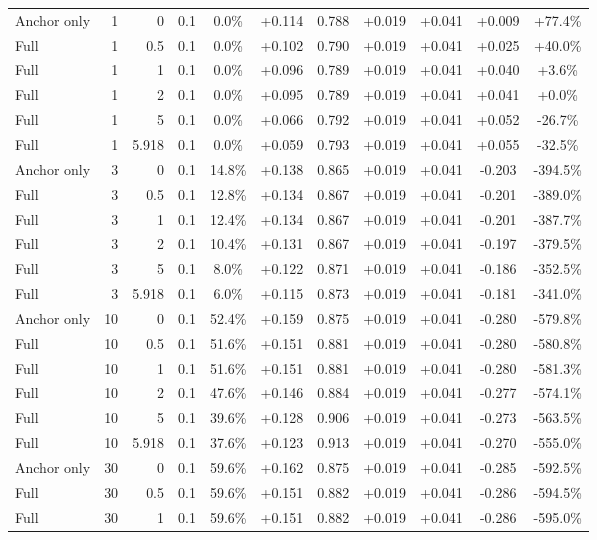 \begin{table}[htbp]
\begin{tabular}{lrrrccccccc}
Anchor only & 1 & 0 & 0.1 & 0.0\% & +0.114 & 0.788 & +0.019 & +0.041 & +0.009 & +77.4\% \\
Full & 1 & 0.5 & 0.1 & 0.0\% & +0.102 & 0.790 & +0.019 & +0.041 & +0.025 & +40.0\% \\
Full & 1 & 1 & 0.1 & 0.0\% & +0.096 & 0.789 & +0.019 & +0.041 & +0.040 & +3.6\% \\
Full & 1 & 2 & 0.1 & 0.0\% & +0.095 & 0.789 & +0.019 & +0.041 & +0.041 & +0.0\% \\
Full & 1 & 5 & 0.1 & 0.0\% & +0.066 & 0.792 & +0.019 & +0.041 & +0.052 & -26.7\% \\
Full & 1 & 5.918 & 0.1 & 0.0\% & +0.059 & 0.793 & +0.019 & +0.041 & +0.055 & -32.5\% \\
Anchor only & 3 & 0 & 0.1 & 14.8\% & +0.138 & 0.865 & +0.019 & +0.041 & -0.203 & -394.5\% \\
Full & 3 & 0.5 & 0.1 & 12.8\% & +0.134 & 0.867 & +0.019 & +0.041 & -0.201 & -389.0\% \\
Full & 3 & 1 & 0.1 & 12.4\% & +0.134 & 0.867 & +0.019 & +0.041 & -0.201 & -387.7\% \\
Full & 3 & 2 & 0.1 & 10.4\% & +0.131 & 0.867 & +0.019 & +0.041 & -0.197 & -379.5\% \\
Full & 3 & 5 & 0.1 & 8.0\% & +0.122 & 0.871 & +0.019 & +0.041 & -0.186 & -352.5\% \\
Full & 3 & 5.918 & 0.1 & 6.0\% & +0.115 & 0.873 & +0.019 & +0.041 & -0.181 & -341.0\% \\
Anchor only & 10 & 0 & 0.1 & 52.4\% & +0.159 & 0.875 & +0.019 & +0.041 & -0.280 & -579.8\% \\
Full & 10 & 0.5 & 0.1 & 51.6\% & +0.151 & 0.881 & +0.019 & +0.041 & -0.280 & -580.8\% \\
Full & 10 & 1 & 0.1 & 51.6\% & +0.151 & 0.881 & +0.019 & +0.041 & -0.280 & -581.3\% \\
Full & 10 & 2 & 0.1 & 47.6\% & +0.146 & 0.884 & +0.019 & +0.041 & -0.277 & -574.1\% \\
Full & 10 & 5 & 0.1 & 39.6\% & +0.128 & 0.906 & +0.019 & +0.041 & -0.273 & -563.5\% \\
Full & 10 & 5.918 & 0.1 & 37.6\% & +0.123 & 0.913 & +0.019 & +0.041 & -0.270 & -555.0\% \\
Anchor only & 30 & 0 & 0.1 & 59.6\% & +0.162 & 0.875 & +0.019 & +0.041 & -0.285 & -592.5\% \\
Full & 30 & 0.5 & 0.1 & 59.6\% & +0.151 & 0.882 & +0.019 & +0.041 & -0.286 & -594.5\% \\
Full & 30 & 1 & 0.1 & 59.6\% & +0.151 & 0.882 & +0.019 & +0.041 & -0.286 & -595.0\% \\

\end{tabular}
\end{table}
